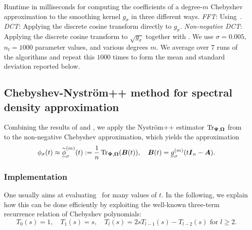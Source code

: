 \begin{table}[ht]
    \caption{Runtime in milliseconds for computing the coefficients of a degree-$m$ Chebyshev approximation to the smoothing kernel $g_{\sigma}$ in three different ways. \emph{FFT}: Using~\cite[Algorithm 1]{lin-2017-randomized-estimation}.  \emph{DCT}: Applying the discrete cosine transform directly to $g_\sigma$.  \emph{Non-negative DCT}: Applying the discrete cosine transform to $\sqrt{g_\sigma}$ together with . We use $\sigma=0.005$, $n_t=1000$ parameter values, and various degrees $m$. We average over 7 runs of the algorithms and repeat this $1000$ times to form the mean and standard deviation reported below.}
    \label{tab:chebyshev-timing-interpolation}
   
\end{table}


\subsection{Chebyshev-Nyström++ method for spectral density approximation}
\label{subsec:chebyshev-nystrom}

Combining the results of  and , we apply the Nyström++ estimator $\operatorname{Tr}_{\boldsymbol{\Psi}, \boldsymbol{\Omega}}$ from~
to the non-negative 
Chebyshev approximation, which yields the approximation
\begin{equation}
    \phi_{\sigma}(t) \approx \widetilde{\underline{\phi}}_{\sigma}^{(m)}(t) := \frac{1}{n} \operatorname{Tr}_{\boldsymbol{\Psi}, \boldsymbol{\Omega}}(\boldsymbol{B}(t)), \quad \boldsymbol{B}(t) = \underline{g}_{\sigma}^{(m)}(t \boldsymbol{I}_n - \boldsymbol{A}).
    \label{equ:chebyshev-nystrom-formula}
\end{equation}


\subsubsection{Implementation}
\label{subsubsec:chebyshev-nystrom-implementation}

One usually aims at evaluating~ for many values of $t$. In the following, we explain how this can be done efficiently by exploiting 
the well-known three-term recurrence relation of Chebyshev polynomials:
\begin{equation}
    T_0(s) = 1,\quad  T_1(s) = s,\quad 
    T_l(s) = 2 s T_{l-1}(s) - T_{l-2}(s) \text{ for $l \geq 2$.}
    \label{equ:chebyshev-recurrence}
\end{equation}

